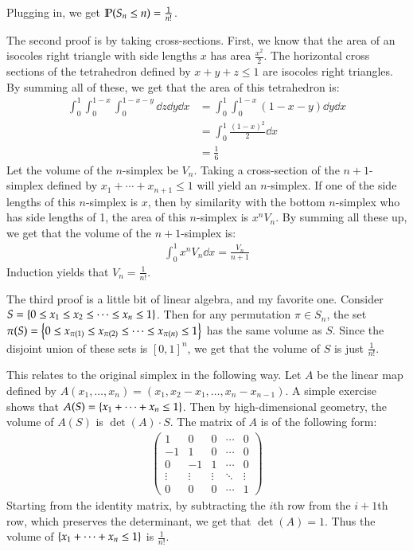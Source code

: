 \documentclass[12pt]{article}
\theoremstyle{definitionstyle}
\newcommand{\SET}[1]{\Set{\mskip-\medmuskip #1 \mskip-\medmuskip}}
\newcommand{\1}{\mathds 1}
\renewcommand{\P}{\mathbb P \qty}
\begin{document}
\begin{enumerate}
        Plugging in, we get $\P(S_n \leq n) = \frac{1}{n!}$. 

        The second proof is by taking cross-sections. First, we know that the area of an isocoles right triangle with side lengths $x$ has area $\frac{x^2}{2}$. The horizontal cross sections of the tetrahedron defined by $x+y+z \leq 1$ are isocoles right triangles. By summing all of these, we get that the area of this tetrahedron is:
        \begin{align*}
            \int_0^1 \int_0^{1-x} \int_0^{1-x-y} \dd z \dd y \dd x &= \int_0^1 \int_0^{1-x} (1-x-y) \dd y \dd x \\
            &= \int_0^1 \frac{(1-x)^2}{2} \dd x \\
            &= \frac{1}{6}
        \end{align*}
        Let the volume of the $n$-simplex be $V_n$. Taking a cross-section of the $n+1$-simplex defined by $x_1 + \cdots + x_{n+1} \leq 1$ will yield an $n$-simplex. If one of the side lengths of this $n$-simplex is $x$, then by similarity with the bottom $n$-simplex who has side lengths of 1, the area of this $n$-simplex is $x^nV_n$. By summing all these up, we get that the volume of the $n+1$-simplex is:
        \begin{align*}
            \int_0^1 x^n V_n \dd x = \frac{V_n}{n+1}
        \end{align*}
        Induction yields that $V_n = \frac{1}{n!}$.

        The third proof is a little bit of linear algebra, and my favorite one. Consider $S = \SET{0 \leq x_1 \leq x_2 \leq \cdots \leq x_n \leq 1}$. Then for any permutation $\pi \in S_n$, the set $\pi(S) = \SET{0 \leq x_{\pi(1)} \leq x_{\pi(2)} \leq \cdots \leq x_{\pi(n)} \leq 1}$ has the same volume as $S$. Since the disjoint union of these sets is $[0,1]^n$, we get that the volume of $S$ is just $\frac{1}{n!}$. 

        This relates to the original simplex in the following way. Let $A$ be the linear map defined by $A(x_1, \ldots, x_n) = (x_1, x_2 - x_1, \ldots, x_n - x_{n-1})$. A simple exercise shows that $A(S) = \SET{x_1 + \cdots + x_n \leq 1}$. Then by high-dimensional geometry, the volume of $A(S)$ is $\det(A) \cdot S$. The matrix of $A$ is of the following form:
        \begin{align*}
            \begin{pmatrix}
                1 & 0 & 0 & \cdots & 0 \\
                -1 & 1 & 0 & \cdots & 0 \\
                0 & -1 & 1 & \cdots & 0 \\
                \vdots & \vdots & \vdots & \ddots & \vdots \\
                0 & 0 & 0 & \cdots & 1
            \end{pmatrix}
        \end{align*}
        Starting from the identity matrix, by subtracting the $i$th row from the $i+1$th row, which preserves the determinant, we get that $\det(A) = 1$. Thus the volume of $\SET{x_1 + \cdots + x_n \leq 1}$ is $\frac{1}{n!}$.


\end{enumerate}
\end{document}
